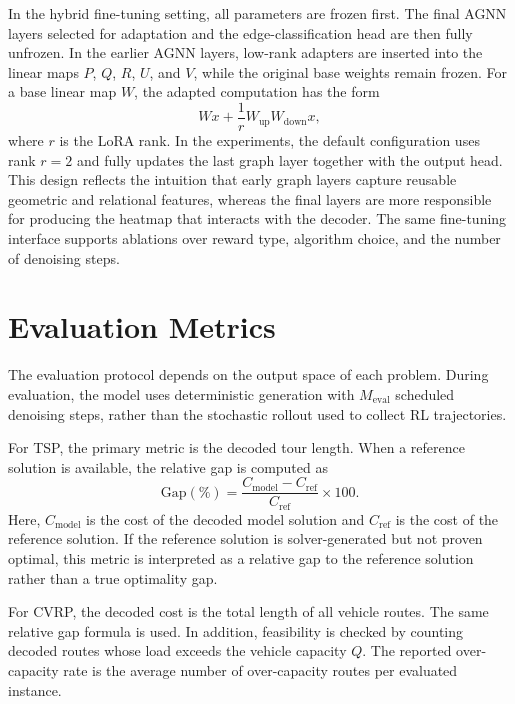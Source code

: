 In the hybrid fine-tuning setting, all parameters are frozen first. The final AGNN layers selected for adaptation and the edge-classification head are then fully unfrozen. In the earlier AGNN layers, low-rank adapters \citep{hu2022lora} are inserted into the linear maps \(P\), \(Q\), \(R\), \(U\), and \(V\), while the original base weights remain frozen. For a base linear map \(W\), the adapted computation has the form
\[
    Wx
    +
    \frac{1}{r}
    W_{\mathrm{up}}
    W_{\mathrm{down}}
    x,
\]
where \(r\) is the LoRA rank. In the experiments, the default configuration uses rank \(r=2\) and fully updates the last graph layer together with the output head. This design reflects the intuition that early graph layers capture reusable geometric and relational features, whereas the final layers are more responsible for producing the heatmap that interacts with the decoder. The same fine-tuning interface supports ablations over reward type, algorithm choice, and the number of denoising steps.

\section{Evaluation Metrics}
\label{sec:evaluation-metrics}

The evaluation protocol depends on the output space of each problem. During evaluation, the model uses deterministic generation with \(M_{\mathrm{eval}}\) scheduled denoising steps, rather than the stochastic rollout used to collect RL trajectories.

For TSP, the primary metric is the decoded tour length. When a reference solution is available, the relative gap is computed as
\[
    \mathrm{Gap}(\%)
    =
    \frac{
        C_{\mathrm{model}} - C_{\mathrm{ref}}
    }{
        C_{\mathrm{ref}}
    }
    \times 100.
\]
Here, \(C_{\mathrm{model}}\) is the cost of the decoded model solution and \(C_{\mathrm{ref}}\) is the cost of the reference solution. If the reference solution is solver-generated but not proven optimal, this metric is interpreted as a relative gap to the reference solution rather than a true optimality gap.

For CVRP, the decoded cost is the total length of all vehicle routes. The same relative gap formula is used. In addition, feasibility is checked by counting decoded routes whose load exceeds the vehicle capacity \(Q\). The reported over-capacity rate is the average number of over-capacity routes per evaluated instance.

